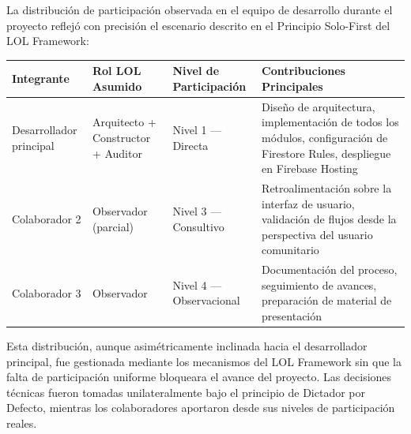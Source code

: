 \documentclass[14pt,a4paper,oneside]{extbook}
\begin{document}
La distribución de participación observada en el equipo de desarrollo durante el proyecto reflejó con precisión el escenario descrito en el Principio Solo-First del LOL Framework:

\begin{table}[htbp]
\centering
\begin{tabular}{p{} p{} p{} p{}}
\toprule
\textbf{Integrante} & \textbf{Rol LOL Asumido} & \textbf{Nivel de Participación} & \textbf{Contribuciones Principales} \\
\midrule
Desarrollador principal & Arquitecto + Constructor + Auditor & Nivel 1 — Directa & Diseño de arquitectura, implementación de todos los módulos, configuración de Firestore Rules, despliegue en Firebase Hosting \\
Colaborador 2 & Observador (parcial) & Nivel 3 — Consultivo & Retroalimentación sobre la interfaz de usuario, validación de flujos desde la perspectiva del usuario comunitario \\
Colaborador 3 & Observador & Nivel 4 — Observacional & Documentación del proceso, seguimiento de avances, preparación de material de presentación \\
\bottomrule
\end{tabular}
\end{table}

Esta distribución, aunque asimétricamente inclinada hacia el desarrollador principal, fue gestionada mediante los mecanismos del LOL Framework sin que la falta de participación uniforme bloqueara el avance del proyecto. Las decisiones técnicas fueron tomadas unilateralmente bajo el principio de Dictador por Defecto, mientras los colaboradores aportaron desde sus niveles de participación reales.
\end{document}
